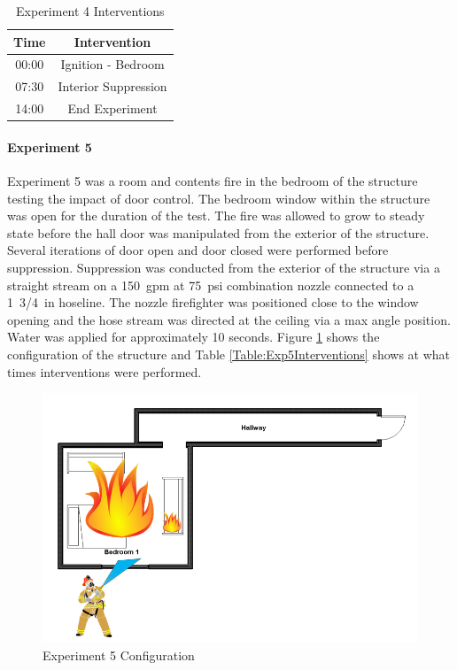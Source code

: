 \documentclass[12pt,oneside]{book}
\begin{document}
\begin{table}[H]
	\centering
	\caption{Experiment 4 Interventions}
	\begin{tabular}{|c|c|} 
		\hline
		Time & Intervention \\ \hline \hline
		00:00 & Ignition - Bedroom \\ \hline
		07:30 & Interior Suppression \\ \hline
		14:00 & End Experiment\\ \hline
	\end{tabular}
	\label{Table:Exp4Interventions}
\end{table}

\clearpage

\paragraph{Experiment 5} \mbox{}

Experiment 5 was a room and contents fire in the bedroom of the structure testing the impact of door control. The bedroom window within the structure was open for the duration of the test. The fire was allowed to grow to steady state before the hall door was manipulated from the exterior of the structure. Several iterations of door open and door closed were performed before suppression. Suppression was conducted from the exterior of the structure via a straight stream on a 150~gpm at 75~psi combination nozzle connected to a 1~3/4~in hoseline. The nozzle firefighter was positioned close to the window opening and the hose stream was directed at the ceiling via a max angle position. Water was applied for approximately 10 seconds. Figure \ref{fig:Exp5Config} shows the configuration of the structure and Table \ref{Table:Exp5Interventions} shows at what times interventions were performed.


\begin{figure}[H]
	\centering
	\includegraphics[width=5in]{Howard_Exp_5.png}
	\caption{Experiment 5 Configuration}
	\label{fig:Exp5Config}
\end{figure}
\end{document}
